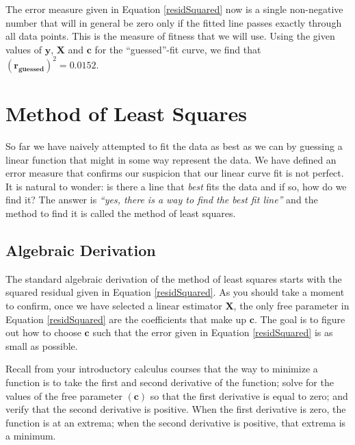 The error measure given in Equation \ref{residSquared} now is a single
non-negative number that will in general be zero only if the fitted line passes exactly through all data points.  This is the measure of fitness that we will use.
Using the given values of $\mathbf{y}$, $\mathbf{X}$ and $\mathbf{c}$ for the
``guessed''-fit curve, we find that $\left(\mathbf{r_{\text{guessed}}}\right)^{2} = 0.0152.$ 

\section{Method of Least Squares}

So far we have naively attempted to fit the data as best as we can by guessing
a linear function that might in some way represent the data.  We have defined
an error measure that confirms our suspicion that our linear curve fit is not
perfect.  It is natural to wonder: is there a line that \emph{best} fits the
data and if so, how do we find it? The answer is \emph{``yes, there is a way to find the best fit line''} and the method to find it is called the method of least squares. 

\subsection{Algebraic Derivation}

The standard algebraic derivation of the method of least squares starts with the squared residual given in Equation \ref{residSquared}.  As you should take a moment to confirm, once we have selected a linear estimator $\mathbf{X}$, the only free parameter in Equation
\ref{residSquared} are the coefficients that make up $\mathbf{c}$.  The goal
is to figure out how to choose $\mathbf{c}$ such that the error given in
Equation \ref{residSquared} is as small as possible.

Recall from your introductory calculus courses that the way to minimize a
function is to take the first and second derivative of the function; solve for
the values of the free parameter $(\mathbf{c})$ so that the first derivative
is equal to zero; and verify that the second derivative is positive.  When the
first derivative is zero, the function is at an extrema; when the second
derivative is positive, that extrema is a minimum.

